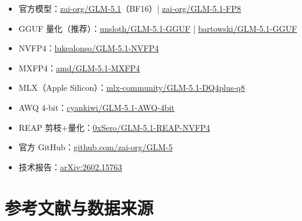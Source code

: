 \documentclass[UTF8,a4paper,10pt,oneside]{ctexart}
\begin{document}
\begin{itemize}
    \item 官方模型：\href{https://huggingface.co/zai-org/GLM-5.1}{zai-org/GLM-5.1}（BF16）| \href{https://huggingface.co/zai-org/GLM-5.1-FP8}{zai-org/GLM-5.1-FP8}
    \item GGUF 量化（推荐）：\href{https://huggingface.co/unsloth/GLM-5.1-GGUF}{unsloth/GLM-5.1-GGUF} | \href{https://huggingface.co/bartowski/zai-org_GLM-5.1-GGUF}{bartowski/GLM-5.1-GGUF}
    \item NVFP4：\href{https://huggingface.co/lukealonso/GLM-5.1-NVFP4}{lukealonso/GLM-5.1-NVFP4}
    \item MXFP4：\href{https://huggingface.co/amd/GLM-5.1-MXFP4}{amd/GLM-5.1-MXFP4}
    \item MLX（Apple Silicon）：\href{https://huggingface.co/mlx-community/GLM-5.1-DQ4plus-q8}{mlx-community/GLM-5.1-DQ4plus-q8}
    \item AWQ 4-bit：\href{https://huggingface.co/cyankiwi/GLM-5.1-AWQ-4bit}{cyankiwi/GLM-5.1-AWQ-4bit}
    \item REAP 剪枝+量化：\href{https://huggingface.co/0xSero/GLM-5.1-478B-A42B-REAP-NVFP4}{0xSero/GLM-5.1-REAP-NVFP4}
    \item 官方 GitHub：\href{https://github.com/zai-org/GLM-5}{github.com/zai-org/GLM-5}
    \item 技术报告：\href{https://arxiv.org/abs/2602.15763}{arXiv:2602.15763}
\end{itemize}


\section*{参考文献与数据来源}
\end{document}
